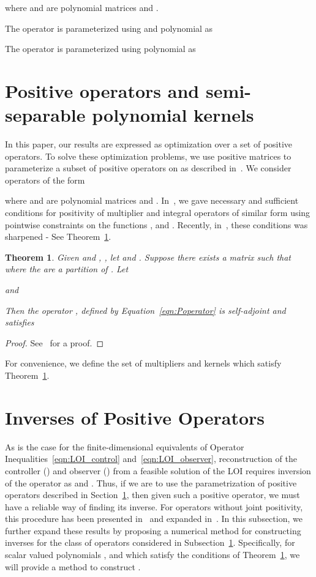 \documentclass[9pt,journal,twocolumn]{IEEEtran}
\newtheorem{theorem}{Theorem}
\begin{document}
where  and  are polynomial matrices and .

The operator  is parameterized using   and  polynomial  as



The operator  is parameterized using polynomial  as

\section{Positive operators and semi-separable polynomial kernels}\label{subsec:positivity}

In this paper, our results are expressed as optimization over a set of positive operators. To solve these optimization problems, we use positive matrices to parameterize a subset of positive operators on  as described in~\cite{peetlmi}. We consider operators of the form

where  and  are polynomial matrices and .  In~\cite{peet2008using}, we gave necessary and sufficient conditions for positivity of multiplier and integral operators of similar form using pointwise constraints on the functions ,  and . Recently, in~\cite{peetlmi}, these conditions was sharpened - See Theorem~\ref{thm:jointpos}.

\begin{theorem}\label{thm:jointpos}
Given  and , , let  and .
Suppose there exists a matrix  such that
 where the  are a partition of . Let

and


Then the operator , defined by Equation~\eqref{eqn:Poperator} is  self-adjoint and satisfies



\end{theorem}
\begin{proof}
See~\cite{peetlmi} for a proof.
\end{proof}

For convenience, we define the set of multipliers and kernels which satisfy Theorem~\ref{thm:jointpos}.


\section{Inverses of Positive Operators}

As is the case for the finite-dimensional equivalents of Operator Inequalities~\eqref{eqn:LOI_control} and~\eqref{eqn:LOI_observer}, reconstruction of the controller () and observer () from a feasible solution of the LOI requires inversion of the operator  as  and . Thus, if we are to use the parametrization of positive operators described in Section~\ref{subsec:positivity}, then given such a positive operator, we must have a reliable way of finding its inverse. For operators without joint positivity, this procedure has been presented in~\cite{peet2009inverses} and expanded in~\cite{peet2013inverses}. In this subsection, we further expand these results by proposing a numerical method for constructing inverses for the class of operators considered in Subsection~\ref{subsec:positivity}.
 Specifically, for scalar valued polynomials ,  and  which satisfy the conditions of Theorem~\ref{thm:jointpos}, we will provide a method to construct .
\end{document}
